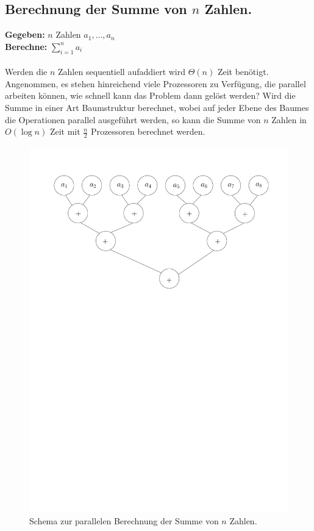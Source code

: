 \subsection{Berechnung der Summe von $n$ Zahlen.}
{\bf{Gegeben:}} $n$ Zahlen $a_1,\ldots,a_{n}$\\
{\bf{Berechne:}} $\sum_{i=1}^{n}{a_i}$\\
\\
Werden die $n$ Zahlen sequentiell aufaddiert wird $\Theta(n)$ Zeit benötigt. Angenommen, es stehen hinreichend viele Prozessoren zu Verfügung, die parallel arbeiten können, wie schnell kann das Problem dann gelöst werden? Wird die Summe in einer Art Baumstruktur berechnet, wobei auf jeder Ebene des Baumes die Operationen parallel ausgeführt werden, so kann die Summe von $n$ Zahlen in $O(\log n)$ Zeit mit $\frac{n}{2}$ Prozessoren berechnet werden.
\begin{figure}[h!]
\centering
\includegraphics[scale=0.8]{bilder/SummeParallel.pdf}
\caption{Schema zur parallelen Berechnung der Summe von $n$ Zahlen.}
\end{figure}

